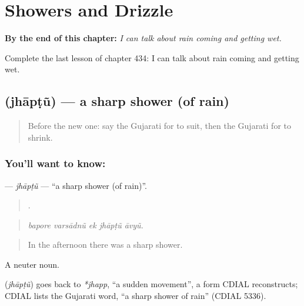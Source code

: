 
\chapter{Showers and Drizzle}
\label{ch:gu-showers-and-drizzle}

\begin{chapteropening}
\textbf{By the end of this chapter:} \emph{I can talk about rain coming and getting wet.}

Complete the last lesson of chapter 434: I can talk about rain coming and getting wet.
\end{chapteropening}

\section[\texorpdfstring{\gu{ઝાપટું} (jhāpṭũ)}{ઝાપટું (jhāpṭũ)}]{ (jhāpṭũ) — a sharp shower (of rain)}

\label{lesson:GU-C434-jhaptu}



\begin{quote}
Before the new one: say the Gujarati for to suit, then the Gujarati for to shrink.
\end{quote}

\subsection*{You'll want to know: }
\textbf{} — \emph{jhāpṭũ} — \textquotedblleft{}a sharp shower (of rain)\textquotedblright{}.

\begin{quote}
    .
\end{quote}

\begin{quote}
\emph{bapore varsādnũ ek jhāpṭũ āvyũ.}
\end{quote}

\begin{quote}
In the afternoon there was a sharp shower.
\end{quote}

A neuter noun.

\begin{cousinweb}
\textbf{} (\emph{jhāpṭũ}) goes back to \emph{*jhapp}, \textquotedblleft{}a sudden movement\textquotedblright{}, a form CDIAL reconstructs; CDIAL lists the Gujarati word, \textquotedblleft{}a sharp shower of rain\textquotedblright{} (CDIAL 5336).
\end{cousinweb}

